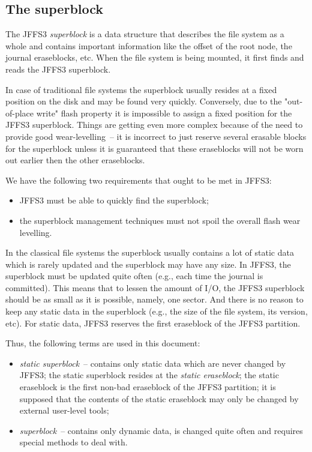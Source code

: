 \documentclass[12pt,a4paper,oneside,titlepage]{article}
\begin{document}
\subsection{The superblock}

The JFFS3 \emph{superblock} is a data structure that describes the file system
as a whole and contains important information like the offset of the root node,
the journal eraseblocks, etc. When the file system is being mounted, it first
finds and reads the JFFS3 superblock.

In case of traditional file systems the superblock usually resides at a fixed
position on the disk and may be found very quickly. Conversely, due to the
"\mbox{out-of-place} write" flash property it is impossible to assign a fixed
position for the JFFS3 superblock. Things are getting even more complex because
of the need to provide good \mbox{wear-levelling}~-- it is incorrect to just
reserve several erasable blocks for the superblock unless it is guaranteed that
these eraseblocks will not be worn out earlier then the other eraseblocks.

We have the following two requirements that ought to be met in JFFS3:

\begin{itemize}

\item JFFS3 must be able to quickly find the superblock;

\item the superblock management techniques must not spoil the overall flash
wear levelling.

\end{itemize}

In the classical file systems the superblock usually contains a lot of static
data which is rarely updated and the superblock may have any size. In JFFS3,
the superblock must be updated quite often (e.g., each time the journal is
committed). This means that to lessen the amount of I/O, the JFFS3 superblock
should be as small as it is possible, namely, one sector. And there is no
reason to keep any static data in the superblock (e.g., the size of the file
system, its version, etc). For static data, JFFS3 reserves the first eraseblock
of the JFFS3 partition.

Thus, the following terms are used in this document:

\begin{itemize}

\item \emph{static superblock}~-- contains only static data which are never
changed by JFFS3; the static superblock resides at the \emph{static
eraseblock}; the static eraseblock is the first \mbox{non-bad} eraseblock of
the JFFS3 partition; it is supposed that the contents of the static eraseblock
may only be changed by external \mbox{user-level} tools;

\item \emph{superblock}~-- contains only dynamic data, is changed quite
often and requires special methods to deal with.

\end{itemize}
\end{document}

